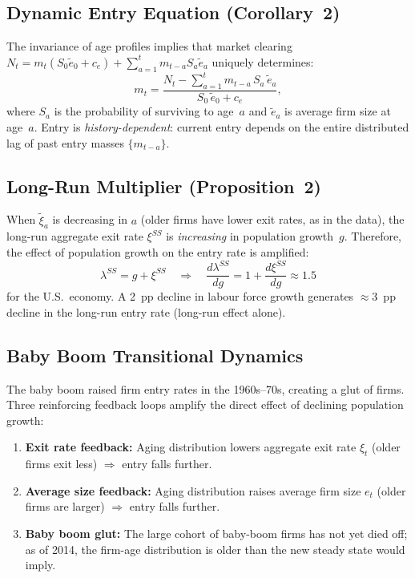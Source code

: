 \subsection*{Dynamic Entry Equation (Corollary~2)}

The invariance of age profiles implies that market clearing
$N_t = m_t(S_0\tilde{e}_0+c_e) + \sum_{a=1}^{t}m_{t-a}S_a\tilde{e}_a$
uniquely determines:
\begin{equation}
  m_t = \frac{N_t - \sum_{a=1}^{t}m_{t-a}\,S_a\,\tilde{e}_a}{S_0\,\tilde{e}_0 + c_e},
  \label{eq:hns_entry}
\end{equation}
where $S_a$ is the probability of surviving to age~$a$ and $\tilde{e}_a$
is average firm size at age~$a$. Entry is \emph{history-dependent}: current
entry depends on the entire distributed lag of past entry masses
$\{m_{t-a}\}$.

\subsection*{Long-Run Multiplier (Proposition~2)}

When $\tilde{\xi}_a$ is decreasing in $a$ (older firms have lower exit
rates, as in the data), the long-run aggregate exit rate $\xi^{SS}$ is
\emph{increasing} in population growth~$g$. Therefore, the effect of
population growth on the entry rate is amplified:
\begin{equation}
  \lambda^{SS} = g + \xi^{SS} \quad\Rightarrow\quad
  \frac{d\lambda^{SS}}{dg} = 1 + \frac{d\xi^{SS}}{dg} \approx 1.5
  \label{eq:hns_multiplier}
\end{equation}
for the U.S.\ economy. A 2~pp decline in labour force growth generates
$\approx 3$~pp decline in the long-run entry rate (long-run effect alone).

\subsection*{Baby Boom Transitional Dynamics}

The baby boom raised firm entry rates in the 1960s--70s, creating a glut
of firms. Three reinforcing feedback loops amplify the direct effect of
declining population growth:
\begin{enumerate}
  \item \textbf{Exit rate feedback:} Aging distribution lowers aggregate
    exit rate $\xi_t$ (older firms exit less) $\Rightarrow$ entry falls
    further.
  \item \textbf{Average size feedback:} Aging distribution raises average
    firm size $e_t$ (older firms are larger) $\Rightarrow$ entry falls
    further.
  \item \textbf{Baby boom glut:} The large cohort of baby-boom firms has
    not yet died off; as of 2014, the firm-age distribution is older than
    the new steady state would imply.
\end{enumerate}

